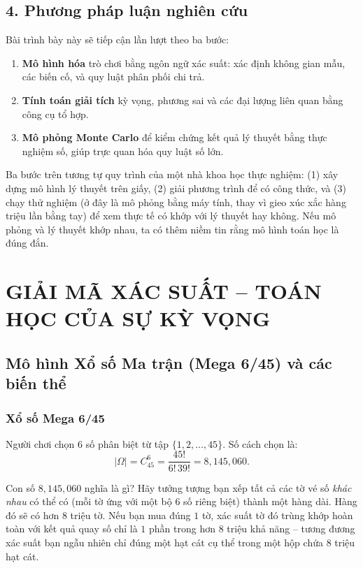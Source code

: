 \documentclass[12pt,a4paper]{article}
\theoremstyle{coloredthm}
\theoremstyle{coloreddef}
\theoremstyle{remark}
\begin{document}
\subsection*{4. Phương pháp luận nghiên cứu}

Bài trình bày này sẽ tiếp cận lần lượt theo ba bước:
\begin{enumerate}
    \item \textbf{Mô hình hóa} trò chơi bằng ngôn ngữ xác suất: xác định không gian mẫu, các biến cố, và quy luật phân phối chi trả.
    \item \textbf{Tính toán giải tích} kỳ vọng, phương sai và các đại lượng liên quan bằng công cụ tổ hợp.
    \item \textbf{Mô phỏng Monte Carlo} để kiểm chứng kết quả lý thuyết bằng thực nghiệm số, giúp trực quan hóa quy luật số lớn.
\end{enumerate}

\begin{giaithich}
Ba bước trên tương tự quy trình của một nhà khoa học thực nghiệm: (1) xây dựng mô hình lý thuyết trên giấy, (2) giải phương trình để có công thức, và (3) chạy thử nghiệm (ở đây là mô phỏng bằng máy tính, thay vì gieo xúc xắc hàng triệu lần bằng tay) để xem thực tế có khớp với lý thuyết hay không. Nếu mô phỏng và lý thuyết khớp nhau, ta có thêm niềm tin rằng mô hình toán học là đúng đắn.
\end{giaithich}

\section{GIẢI MÃ XÁC SUẤT -- TOÁN HỌC CỦA SỰ KỲ VỌNG}

\subsection{Mô hình Xổ số Ma trận (Mega 6/45) và các biến thể}

\subsubsection{Xổ số Mega 6/45}

Người chơi chọn $6$ số phân biệt từ tập $\{1,2,\dots,45\}$. Số cách chọn là:
\[
|\Omega| = C_{45}^6 = \frac{45!}{6!\,39!} = 8{,}145{,}060.
\]

\begin{giaithich}
Con số $8{,}145{,}060$ nghĩa là gì? Hãy tưởng tượng bạn xếp tất cả các tờ vé số \emph{khác nhau} có thể có (mỗi tờ ứng với một bộ $6$ số riêng biệt) thành một hàng dài. Hàng đó sẽ có hơn $8$ triệu tờ. Nếu bạn mua đúng $1$ tờ, xác suất tờ đó trùng khớp hoàn toàn với kết quả quay số chỉ là $1$ phần trong hơn $8$ triệu khả năng -- tương đương xác suất bạn ngẫu nhiên chỉ đúng một hạt cát cụ thể trong một hộp chứa $8$ triệu hạt cát.
\end{giaithich}
\end{document}
